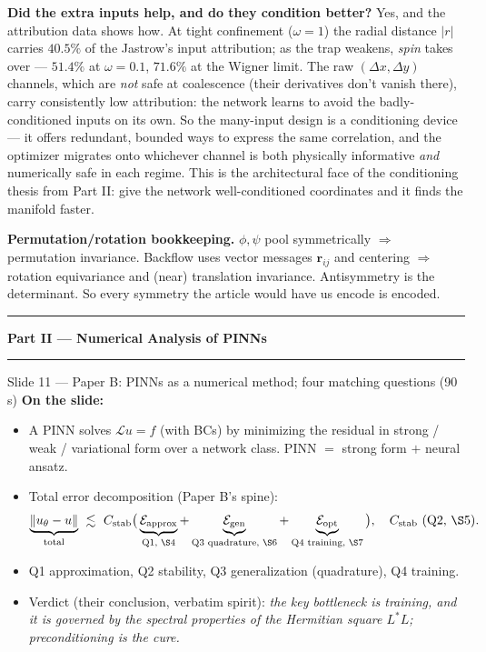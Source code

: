 \documentclass[11pt]{article}
\begin{document}
\begin{depth}
\textbf{Did the extra inputs help, and do they condition better?} Yes, and the attribution data
shows how. At tight confinement ($\omega{=}1$) the radial distance $|r|$ carries $40.5\%$ of the
Jastrow's input attribution; as the trap weakens, \emph{spin} takes over --- $51.4\%$ at $\omega{=}
0.1$, $71.6\%$ at the Wigner limit. The raw $(\Delta x,\Delta y)$ channels, which are \emph{not} safe
at coalescence (their derivatives don't vanish there), carry consistently low attribution: the
network learns to avoid the badly-conditioned inputs on its own. So the many-input design is a
conditioning device --- it offers redundant, bounded ways to express the same correlation, and the
optimizer migrates onto whichever channel is both physically informative \emph{and} numerically safe
in each regime. This is the architectural face of the conditioning thesis from Part II: give the
network well-conditioned coordinates and it finds the manifold faster.

\textbf{Permutation/rotation bookkeeping.} $\phi,\psi$ pool symmetrically $\Rightarrow$ permutation
invariance. Backflow uses vector messages $\mathbf r_{ij}$ and centering $\Rightarrow$ rotation
equivariance and (near) translation invariance. Antisymmetry is the determinant. So every symmetry
the article would have us encode is encoded.
\end{depth}

\vspace{2em}\hrule
\begin{center}\Large\textbf{Part II --- Numerical Analysis of PINNs}\end{center}
\hrule\vspace{1em}

\begin{slide}{Slide 11 --- Paper B: PINNs as a numerical method; four matching questions (90\,s)}
\textbf{On the slide:}
\begin{itemize}[leftmargin=*]
\item A PINN solves $\mathcal L u=f$ (with BCs) by minimizing the residual in strong / weak /
variational form over a network class. PINN $=$ strong form $+$ neural ansatz.
\item Total error decomposition (Paper B's spine):
\[
\underbrace{\|u_\theta-u\|}_{\text{total}}\ \lesssim\ C_{\rm stab}\big(
\underbrace{\mathcal E_{\rm approx}}_{\text{Q1, \S4}}+
\underbrace{\mathcal E_{\rm gen}}_{\text{Q3 quadrature, \S6}}+
\underbrace{\mathcal E_{\rm opt}}_{\text{Q4 training, \S7}}\big),\quad
C_{\rm stab}\ \text{(Q2, \S5)}.
\]
\item Q1 approximation, Q2 stability, Q3 generalization (quadrature), Q4 training.
\item Verdict (their conclusion, verbatim spirit): \emph{the key bottleneck is training, and it is
governed by the spectral properties of the Hermitian square $L^\ast L$; preconditioning is the cure.}
\end{itemize}
\end{slide}
\end{document}
